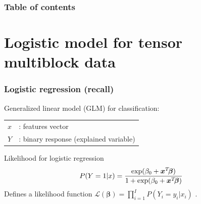 \documentclass{beamer}
\begin{document}


    


\begin{frame}
    \frametitle{Table of contents}
    \tableofcontents
\end{frame}

\section{Logistic model for tensor multiblock data}
\begin{frame}
\sectionpage
\end{frame}


\begin{frame}
    \frametitle{Logistic regression (recall)}
    Generalized linear model (GLM) for classification:\\[15 pt]
    \begin{tabular}{ll}
        $x$ & \hspace{-8 pt}: features vector \hspace{5 cm} \\[5 pt]
        $Y$ & \hspace{-8 pt}: binary response (explained variable) \hspace{10 cm}
    \end{tabular}
\vspace{5 pt}
\begin{block}{Likelihood for logistic regression}
$$P(Y = 1|x) = \frac{\exp(\beta_0 + \bm{x}^T\hspace{-2 pt}\bm{\beta})}{1 + \exp(\beta_0 + \bm{x}^T\hspace{-2 pt}\bm{\beta})}$$
Defines a likelihood function $\mathcal{L}(\bm{\beta}) = \prod_{i = 1}^I P(Y_i = y_i|x_i)$ .
\end{block}

\end{frame}
\end{document}
